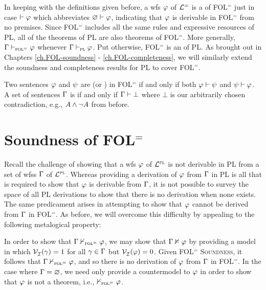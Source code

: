 In keeping with the definitions given before, a wfs $\varphi$ of $\mathcal{L}^{=}$ is a  of FOL$^=$ just in case $\vdash\varphi$ which abbreviates $\varnothing\vdash\varphi$, indicating that $\varphi$ is derivable in FOL$^=$ from no premises.
Since FOL$^=$ includes all the same rules and expressive resources of PL, all of the theorems of PL are also theorems of FOL$^=$.
More generally, $\Gamma \vdash_{\textsc{fol}^=} \varphi$ whenever $\Gamma \vdash_{\textsc{pl}} \varphi$. 
Put otherwise, FOL$^=$ is an  of PL.
As brought out in Chapters \ref{ch.FOL-soundness} - \ref{ch.FOL-completeness}, we will similarly extend the soundness and completeness results for PL to cover FOL$^=$.

Two sentences $\varphi$ and $\psi$ are  (or ) in FOL$^=$ if and only if both $\varphi\vdash\psi$ and $\psi\vdash\varphi$.
A set of sentences $\Gamma$ is  if and only if $\Gamma\vdash\bot$ where $\bot$ is our arbitrarily chosen contradiction, e.g., $A\wedge\neg A$ from before.




\section{Soundness of FOL$^=$}


Recall the challenge of showing that a wfs $\varphi$ of $\mathcal{L}^{\textsc{pl}}$ is not derivable in PL from a set of wfss $\Gamma$ of $\mathcal{L}^{\textsc{pl}}$.
Whereas providing a derivation of $\varphi$ from $\Gamma$ in PL is all that is required to show that $\varphi$ is derivable from $\Gamma$, it is not possible to survey the space of all PL derivations to show that there is no derivation when none exists.
The same predicament arises in attempting to show that $\varphi$ cannot be derived from $\Gamma$ in FOL$^=$.
As before, we will overcome this difficulty by appealing to the following metalogical property:


In order to show that $\Gamma \nvdash_{\textsc{fol}^=} \varphi$, we may show that $\Gamma \nvDash \varphi$ by providing a model in which $\mathcal{V}_{\mathcal{I}}^{}(\gamma) = 1$ for all $\gamma \in \Gamma$ but $\mathcal{V}_{\mathcal{I}}^{}(\varphi) = 0$.
Given \textsc{FOL$^=$ Soundness}, it follows that $\Gamma \nvdash_{\textsc{fol}^=} \varphi$, and so there is no derivation of $\varphi$ from $\Gamma$ in FOL$^=$.
In the case where $\Gamma=\varnothing$, we need only provide a countermodel to $\varphi$ in order to show that $\varphi$ is not a theorem, i.e., $\nvdash_{\textsc{fol}^=} \varphi$.

